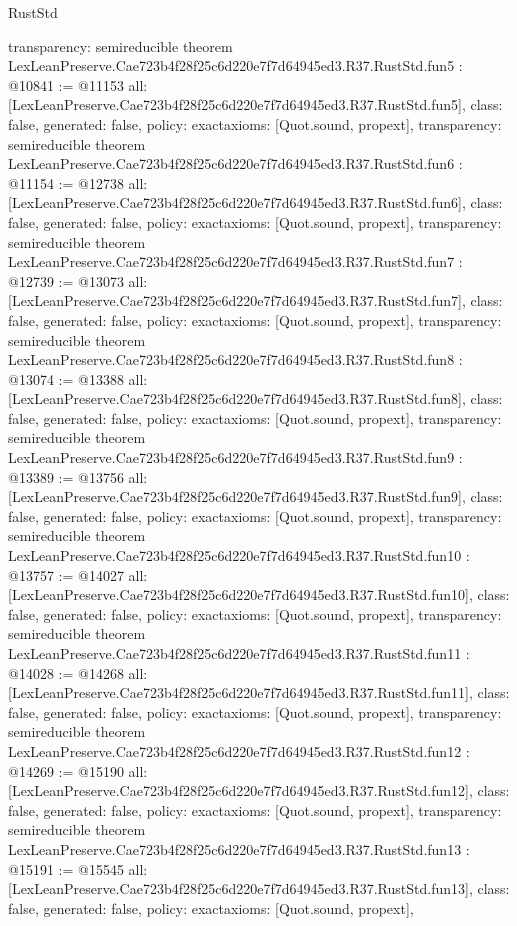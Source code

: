 \begin{lexlean}{RustStd}
\begin{coremodule}
{  transparency: semireducible
}
theorem LexLeanPreserve.Cae723b4f28f25c6d220e7f7d64945ed3.R37.RustStd.fun5 : @10841 := @11153 {
  all: [LexLeanPreserve.Cae723b4f28f25c6d220e7f7d64945ed3.R37.RustStd.fun5],
  class: false,
  generated: false,
  policy: exact{axioms: [Quot.sound, propext]},
  transparency: semireducible
}
theorem LexLeanPreserve.Cae723b4f28f25c6d220e7f7d64945ed3.R37.RustStd.fun6 : @11154 := @12738 {
  all: [LexLeanPreserve.Cae723b4f28f25c6d220e7f7d64945ed3.R37.RustStd.fun6],
  class: false,
  generated: false,
  policy: exact{axioms: [Quot.sound, propext]},
  transparency: semireducible
}
theorem LexLeanPreserve.Cae723b4f28f25c6d220e7f7d64945ed3.R37.RustStd.fun7 : @12739 := @13073 {
  all: [LexLeanPreserve.Cae723b4f28f25c6d220e7f7d64945ed3.R37.RustStd.fun7],
  class: false,
  generated: false,
  policy: exact{axioms: [Quot.sound, propext]},
  transparency: semireducible
}
theorem LexLeanPreserve.Cae723b4f28f25c6d220e7f7d64945ed3.R37.RustStd.fun8 : @13074 := @13388 {
  all: [LexLeanPreserve.Cae723b4f28f25c6d220e7f7d64945ed3.R37.RustStd.fun8],
  class: false,
  generated: false,
  policy: exact{axioms: [Quot.sound, propext]},
  transparency: semireducible
}
theorem LexLeanPreserve.Cae723b4f28f25c6d220e7f7d64945ed3.R37.RustStd.fun9 : @13389 := @13756 {
  all: [LexLeanPreserve.Cae723b4f28f25c6d220e7f7d64945ed3.R37.RustStd.fun9],
  class: false,
  generated: false,
  policy: exact{axioms: [Quot.sound, propext]},
  transparency: semireducible
}
theorem LexLeanPreserve.Cae723b4f28f25c6d220e7f7d64945ed3.R37.RustStd.fun10 : @13757 := @14027 {
  all: [LexLeanPreserve.Cae723b4f28f25c6d220e7f7d64945ed3.R37.RustStd.fun10],
  class: false,
  generated: false,
  policy: exact{axioms: [Quot.sound, propext]},
  transparency: semireducible
}
theorem LexLeanPreserve.Cae723b4f28f25c6d220e7f7d64945ed3.R37.RustStd.fun11 : @14028 := @14268 {
  all: [LexLeanPreserve.Cae723b4f28f25c6d220e7f7d64945ed3.R37.RustStd.fun11],
  class: false,
  generated: false,
  policy: exact{axioms: [Quot.sound, propext]},
  transparency: semireducible
}
theorem LexLeanPreserve.Cae723b4f28f25c6d220e7f7d64945ed3.R37.RustStd.fun12 : @14269 := @15190 {
  all: [LexLeanPreserve.Cae723b4f28f25c6d220e7f7d64945ed3.R37.RustStd.fun12],
  class: false,
  generated: false,
  policy: exact{axioms: [Quot.sound, propext]},
  transparency: semireducible
}
theorem LexLeanPreserve.Cae723b4f28f25c6d220e7f7d64945ed3.R37.RustStd.fun13 : @15191 := @15545 {
  all: [LexLeanPreserve.Cae723b4f28f25c6d220e7f7d64945ed3.R37.RustStd.fun13],
  class: false,
  generated: false,
  policy: exact{axioms: [Quot.sound, propext]},
}
\end{coremodule}
\end{lexlean}
